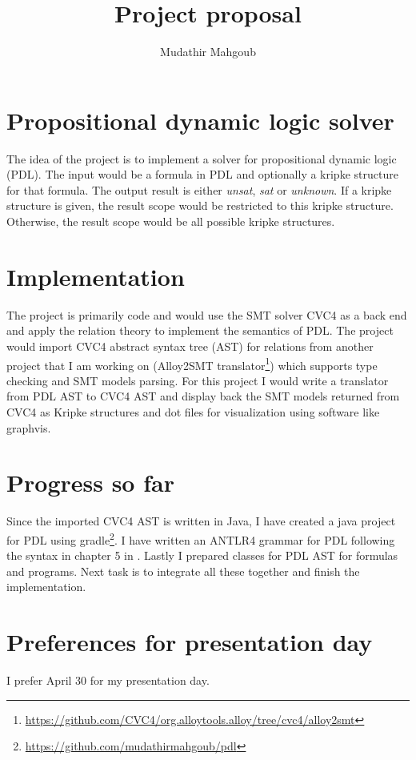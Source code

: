 \documentclass[12pt,a4paper]{article}
\author{Mudathir Mahgoub}
\title{Project proposal}
\begin{document}
\maketitle

\section{Propositional dynamic logic solver}
The idea of the project is to implement a solver for propositional dynamic logic (PDL). The input would be a formula in PDL and optionally a kripke structure for that formula. The output result is either \textit{unsat}, \textit{sat} or \textit{unknown}. If a kripke structure is given, the result scope would be restricted to this kripke structure. Otherwise, the result scope would be all possible kripke structures. 

\section{Implementation}
The project is primarily code and would use the SMT solver CVC4 as a back end and apply the relation theory to implement the semantics of PDL. The project would import CVC4 abstract syntax tree (AST) for relations from another project that I am working on (Alloy2SMT translator\footnote{\url{https://github.com/CVC4/org.alloytools.alloy/tree/cvc4/alloy2smt}}) which supports type checking and SMT models parsing. For this project I would write a translator from PDL AST to CVC4 AST and display back the SMT models returned from CVC4 as Kripke structures and dot files for visualization using software like graphvis.

\section{Progress so far}

Since the imported CVC4 AST is written in Java, I have created a java project for PDL  using gradle\footnote{\url{https://github.com/mudathirmahgoub/pdl}}. I have written an ANTLR4 grammar for PDL following the syntax in chapter 5 in \cite{dynamic}. Lastly I  prepared classes for PDL AST for formulas and programs. Next task is to integrate all these together and finish the implementation. 

\section{Preferences for presentation day}
I prefer April 30 for my presentation day.




\end{document}
